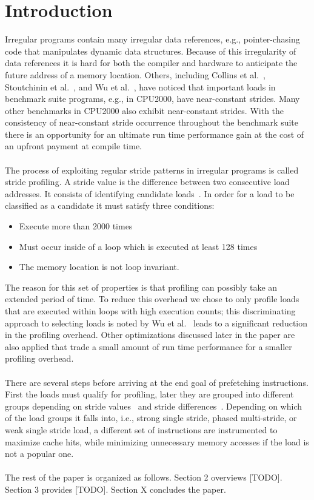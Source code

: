 \documentclass[11pt]{article}
\begin{document}
  \section{Introduction}
  Irregular programs contain many irregular data references, e.g., pointer-chasing code that manipulates dynamic data structures. Because of this irregularity of data references it is hard for both the compiler and hardware to anticipate the future address of a memory location. Others, including Collins et al.~\cite{collins01}, Stoutchinin et al.~\cite{stoutchinin01}, and Wu et al.~\cite{WuEtAl2002}, have noticed that important loads in benchmark suite programs, e.g., in CPU2000, have near-constant strides. Many other benchmarks in CPU2000 also exhibit near-constant strides. With the consistency of near-constant stride occurrence throughout the benchmark suite there is an opportunity for an ultimate run time performance gain at the cost of an upfront payment at compile time. 
  \\\\The process of exploiting regular stride patterns in irregular programs is called stride profiling. A stride value is the difference between two consecutive load addresses. It consists of identifying candidate loads~\cite{WuEtAl2002}. In order for a load to be classified as a candidate it must satisfy three conditions:
  \begin{itemize}
    \item Execute more than 2000 times
    \item Must occur inside of a loop which is executed at least 128 times
    \item The memory location is not loop invariant.
  \end{itemize}
  The reason for this set of properties is that profiling can possibly take an extended period of time. To reduce this overhead we chose to only profile loads that are executed within loops with high execution counts; this discriminating approach to selecting loads is noted by Wu et al.~\cite{WuEtAl2002} leads to a significant reduction in the profiling overhead. Other optimizations discussed later in the paper are also applied that trade a small amount of run time performance for a smaller profiling overhead.
  \\\\There are several steps before arriving at the end goal of prefetching instructions. First the loads must qualify for profiling, later they are grouped into different groups depending on stride values~\cite{Wu2002} and stride differences~\cite{Wu2002}. Depending on which of the load groups it falls into, i.e., strong single stride, phased multi-stride, or weak single stride load, a different set of instructions are instrumented to maximize cache hits, while minimizing unnecessary memory accesses if the load is not a popular one.
  \\\\The rest of the paper is organized as follows. Section 2 overviews [TODO]. Section 3 provides [TODO]. Section X concludes the paper.
\end{document}
